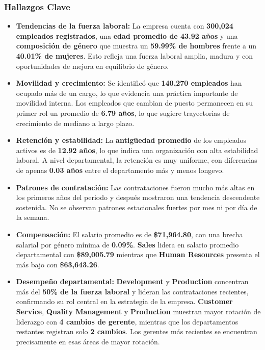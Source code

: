 \documentclass{article}
\begin{document}
\subsubsection*{Hallazgos Clave}
\begin{itemize}
    \item \textbf{Tendencias de la fuerza laboral:} La empresa cuenta con \textbf{300,024 empleados registrados}, una \textbf{edad promedio de 43.92 años} y una \textbf{composición de género} que muestra un \textbf{59.99\% de hombres} frente a un \textbf{40.01\% de mujeres}. Esto refleja una fuerza laboral amplia, madura y con oportunidades de mejora en equilibrio de género.

    \item \textbf{Movilidad y crecimiento:} Se identificó que \textbf{140,270 empleados} han ocupado más de un cargo, lo que evidencia una práctica importante de movilidad interna. Los empleados que cambian de puesto permanecen en su primer rol un promedio de \textbf{6.79 años}, lo que sugiere trayectorias de crecimiento de mediano a largo plazo.

    \item \textbf{Retención y estabilidad:} La \textbf{antigüedad promedio} de los empleados activos es de \textbf{12.92 años}, lo que indica una organización con alta estabilidad laboral. A nivel departamental, la retención es muy uniforme, con diferencias de apenas \textbf{0.03 años} entre el departamento más y menos longevo.

    \item \textbf{Patrones de contratación:} Las contrataciones fueron mucho más altas en los primeros años del periodo y después mostraron una tendencia descendente sostenida. No se observan patrones estacionales fuertes por mes ni por día de la semana.

    \item \textbf{Compensación:} El salario promedio es de \textbf{\$71,964.80}, con una brecha salarial por género mínima de  \textbf{0.09\%}. \textbf{Sales} lidera en salario promedio departamental con \textbf{\$89,005.79} mientras que \textbf{Human Resources} presenta el más bajo con \textbf{\$63,643.26}.

    \item \textbf{Desempeño departamental:} \textbf{Development} y \textbf{Production} concentran más del \textbf{50\% de la fuerza laboral} y lideran las contrataciones recientes, confirmando su rol central en la estrategia de la empresa. \textbf{Customer Service}, \textbf{Quality Management} y \textbf{Production} muestran mayor rotación de liderazgo con \textbf{4 cambios de gerente}, mientras que los departamentos restantes registran solo \textbf{2 cambios}. Los gerentes más recientes se encuentran precisamente en esas áreas de mayor rotación.
\end{itemize}
\end{document}
